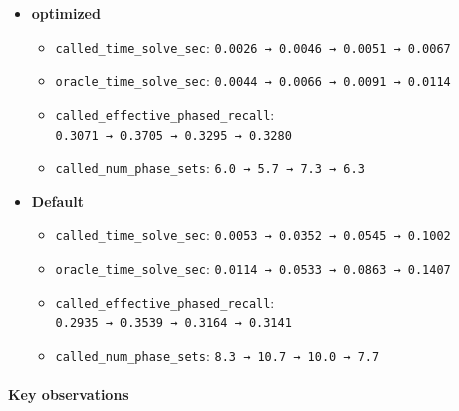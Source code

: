 \documentclass[
]{article}
\providecommand{\tightlist}{%
  \setlength{\itemsep}{0pt}\setlength{\parskip}{0pt}}
\begin{document}
\begin{itemize}
\tightlist
\item
  \textbf{optimized}

  \begin{itemize}
  \tightlist
  \item
    \texttt{called\_time\_solve\_sec}:
    \texttt{0.0026\ →\ 0.0046\ →\ 0.0051\ →\ 0.0067}
  \item
    \texttt{oracle\_time\_solve\_sec}:
    \texttt{0.0044\ →\ 0.0066\ →\ 0.0091\ →\ 0.0114}
  \item
    \texttt{called\_effective\_phased\_recall}:
    \texttt{0.3071\ →\ 0.3705\ →\ 0.3295\ →\ 0.3280}
  \item
    \texttt{called\_num\_phase\_sets}:
    \texttt{6.0\ →\ 5.7\ →\ 7.3\ →\ 6.3}
  \end{itemize}
\item
  \textbf{Default}

  \begin{itemize}
  \tightlist
  \item
    \texttt{called\_time\_solve\_sec}:
    \texttt{0.0053\ →\ 0.0352\ →\ 0.0545\ →\ 0.1002}
  \item
    \texttt{oracle\_time\_solve\_sec}:
    \texttt{0.0114\ →\ 0.0533\ →\ 0.0863\ →\ 0.1407}
  \item
    \texttt{called\_effective\_phased\_recall}:
    \texttt{0.2935\ →\ 0.3539\ →\ 0.3164\ →\ 0.3141}
  \item
    \texttt{called\_num\_phase\_sets}:
    \texttt{8.3\ →\ 10.7\ →\ 10.0\ →\ 7.7}
  \end{itemize}
\end{itemize}

\paragraph{Key observations}\label{key-observations-17}
\end{document}
